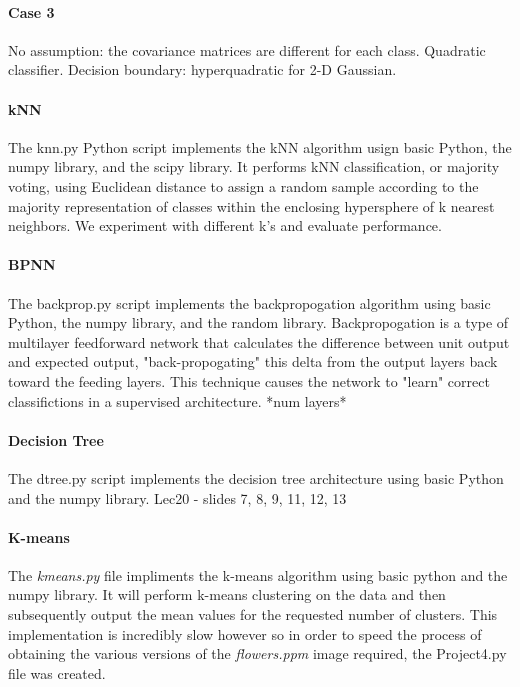 \documentclass{article}
\begin{document}
\paragraph{Case 3}
No assumption: the covariance matrices are different for each class.  
Quadratic classifier.  
Decision boundary: hyperquadratic for 2-D Gaussian.

\paragraph{kNN} 
The knn.py Python script implements the kNN algorithm usign basic Python, the numpy library,
and the scipy library.  It performs kNN classification, or majority voting, using Euclidean
distance to assign a random sample according to the majority representation of classes
within the enclosing hypersphere of k nearest neighbors.  We experiment with different k's
and evaluate performance.

\paragraph{BPNN} 
The backprop.py script implements the backpropogation algorithm using basic Python, the numpy
library, and the random library.  Backpropogation is a type of multilayer feedforward network
that calculates the difference between unit output and expected output, "back-propogating"
this delta from the output layers back toward the feeding layers.  This technique causes the
network to "learn" correct classifictions in a supervised architecture.
*num layers*

\paragraph{Decision Tree} 
The dtree.py script implements the decision tree architecture using basic Python and the numpy
library.  Lec20 - slides 7, 8, 9, 11, 12, 13

\paragraph{K-means} 
The \textit{kmeans.py} file impliments the k-means algorithm using basic
python and the numpy library. It will perform k-means clustering on the 
data and then subsequently output the mean values for the requested number
of clusters. This implementation is incredibly slow however so in order to
speed the process of obtaining the various versions of the \textit{flowers.ppm}
image required, the Project4.py file was created. 
\end{document}
